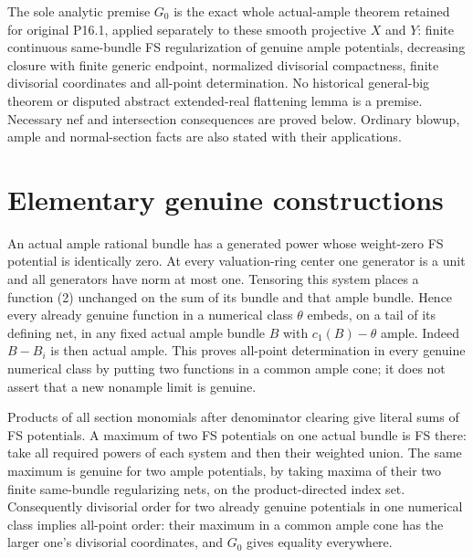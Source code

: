 \documentclass[11pt]{article}
\begin{document}
The sole analytic premise $G_0$ is the exact whole actual-ample
theorem retained for original P16.1, applied separately to these
smooth projective $X$ and $Y$: finite continuous same-bundle FS
regularization of genuine ample potentials, decreasing closure with
finite generic endpoint, normalized divisorial compactness, finite
divisorial coordinates and all-point determination. No historical
general-big theorem or disputed abstract extended-real flattening
lemma is a premise. Necessary nef and intersection consequences are
proved below. Ordinary blowup, ample and normal-section facts are
also stated with their applications.

\section{Elementary genuine constructions}
An actual ample rational bundle has a generated power whose
weight-zero FS potential is identically zero. At every valuation-ring
center one generator is a unit and all generators have norm at most
one. Tensoring this system places a function (2) unchanged on the
sum of its bundle and that ample bundle. Hence every already
genuine function in a numerical class $\theta$ embeds, on a tail
of its defining net, in any fixed actual ample bundle $B$ with
$c_1(B)-\theta$ ample. Indeed $B-B_i$ is then actual ample.
This proves all-point determination in every genuine numerical class
by putting two functions in a common ample cone; it does not assert
that a new nonample limit is genuine.

Products of all section monomials after denominator clearing give
literal sums of FS potentials. A maximum of two FS potentials on
one actual bundle is FS there: take all required powers of each
system and then their weighted union. The same maximum is genuine
for two ample potentials, by taking maxima of their two finite
same-bundle regularizing nets, on the product-directed index set.
Consequently divisorial order for two already genuine potentials
in one numerical class implies all-point order: their maximum
in a common ample cone has the larger one's divisorial coordinates,
and $G_0$ gives equality everywhere.
\end{document}
